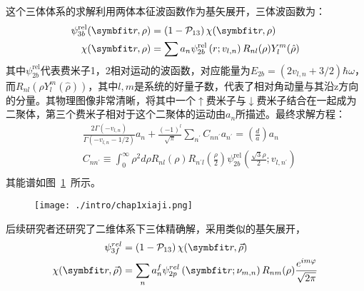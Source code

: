 这个三体体系的求解利用两体本征波函数作为基矢展开\cite{Xiaji2009prl}，三体波函数为：
\begin{equation}
\begin{split}
\psi_{3 b}^{\mathrm{rel}}(\Vector{r}, \rho)&=\left(1-\mathcal{P}_{13}\right) \chi(\Vector{r}, \rho)\\
\chi(\Vector{r}, \rho)&=\sum a_{n} \psi_{2 b}^{\mathrm{rel}}\left(r ; v_{l, n}\right) R_{n l}(\rho) Y_{l}^{m}(\hat{\rho})\\
\end{split}
\end{equation}
其中$\psi_{2 b}^{\mathrm{rel}}$代表费米子1，2相对运动的波函数，对应能量为$E_{2b}=(2v_{l,n}+3/2)\hbar\omega$，而$R_{nl}(\rho Y^m_l(\hat{\rho}))$，其中$l,m$是系统的好量子数，代表了相对角动量与其沿z方向的分量。其物理图像非常清晰，将其中一个$\uparrow$费米子与$\downarrow$费米子结合在一起成为二聚体，第三个费米子相对于这个二聚体的运动由$a_n$所描述。最终求解方程：
\begin{equation}
\begin{split}
&\frac{2 \Gamma\left(-v_{l, n}\right)}{\Gamma\left(-v_{l, n}-1 / 2\right)} a_{n}+\frac{(-1)^{l}}{\sqrt{\pi}} \sum_{n^{\prime}} C_{n n^{\prime}} a_{n^{\prime}}=\left(\frac{d}{a}\right) a_{n}\\
&C_{n n^{\prime}} \equiv \int_{0}^{\infty} \rho^{2} d \rho R_{n l}(\rho) R_{n^{\prime} l}\left(\frac{\rho}{2}\right) \psi_{2 b}^{\mathrm{rel}}\left(\frac{\sqrt{3} \rho}{2} ; v_{l, n^{\prime}}\right)\\
\end{split}
\end{equation}
其能谱如图~\ref{xiaji3d}~所示。
\begin{figure}[!htbp]
    \centering
    \texttt{[image: ./intro/chap1xiaji.png]}
    \label{xiaji3d}
\end{figure}
后续研究者\cite{Xiaji20103b}还研究了二维体系下三体精确解，采用类似的基矢展开，
\begin{equation}
\begin{split}
\psi_{3 f}^{r e l}&=\left(1-\mathcal{P}_{13}\right) \chi(\Vector{r}, \vec{\rho})\\
\chi(\Vector{r}, \vec{\rho})&=\sum_{n} a_{n}^{f} \psi_{2 p}^{r e l}\left(\Vector{r} ; \nu_{m, n}\right) R_{n m}(\rho) \frac{e^{i m \varphi}}{\sqrt{2 \pi}}\\
\end{split}
\end{equation}
